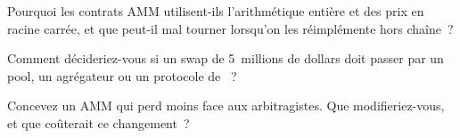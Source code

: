 \begin{interviewq}\label{iq:m3:automated-market-makers:4}
Pourquoi les contrats AMM utilisent-ils l'arithmétique entière et des prix en racine carrée, et que peut-il mal tourner lorsqu'on les réimplémente hors chaîne~?
\end{interviewq}

\begin{interviewq}\label{iq:m3:automated-market-makers:5}
Comment décideriez-vous si un swap de 5~millions de dollars doit passer par un pool, un agrégateur ou un protocole de ~?
\end{interviewq}

\begin{interviewq}\label{iq:m3:automated-market-makers:6}
Concevez un AMM qui perd moins face aux arbitragistes. Que modifieriez-vous, et que coûterait ce changement~?
\end{interviewq}
